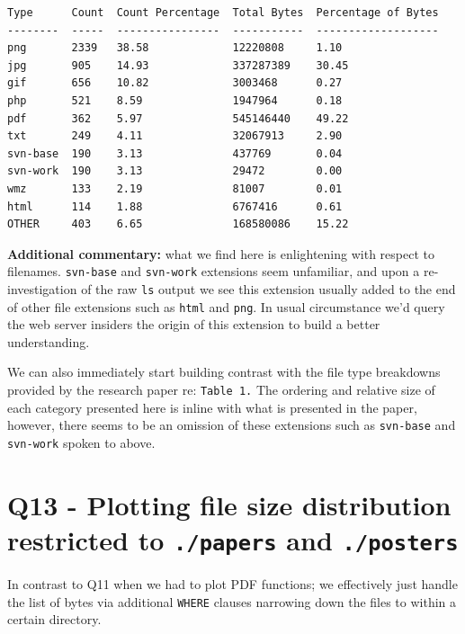 \documentclass{article}
\begin{document}
\vspace{20pt}
\begin{small}
\begin{verbatim}
Type      Count  Count Percentage  Total Bytes  Percentage of Bytes
--------  -----  ----------------  -----------  -------------------
png       2339   38.58             12220808     1.10               
jpg       905    14.93             337287389    30.45              
gif       656    10.82             3003468      0.27               
php       521    8.59              1947964      0.18               
pdf       362    5.97              545146440    49.22              
txt       249    4.11              32067913     2.90               
svn-base  190    3.13              437769       0.04               
svn-work  190    3.13              29472        0.00               
wmz       133    2.19              81007        0.01               
html      114    1.88              6767416      0.61               
OTHER     403    6.65              168580086    15.22              
\end{verbatim}
\end{small}

\textbf{Additional commentary:} what we find here is enlightening with respect to filenames. \texttt{svn-base} and \texttt{svn-work} extensions seem unfamiliar, and upon a re-investigation of the raw \texttt{ls} output we see this extension usually added to the end of other file extensions such as \texttt{html} and \texttt{png}. In usual circumstance we'd query the web server insiders the origin of this extension to build a better understanding.

We can also immediately start building contrast with the file type breakdowns provided by the research paper re: \texttt{Table 1.} The ordering and relative size of each category presented here is inline with what is presented in the paper, however, there seems to be an omission of these extensions such as \texttt{svn-base} and \texttt{svn-work} spoken to above.

\newpage

\section*{Q13 - Plotting file size distribution restricted to \texttt{./papers} and \texttt{./posters}}
In contrast to Q11 when we had to plot PDF functions; we effectively just handle the list of bytes via additional \texttt{WHERE} clauses narrowing down the files to within a certain directory.
\end{document}
